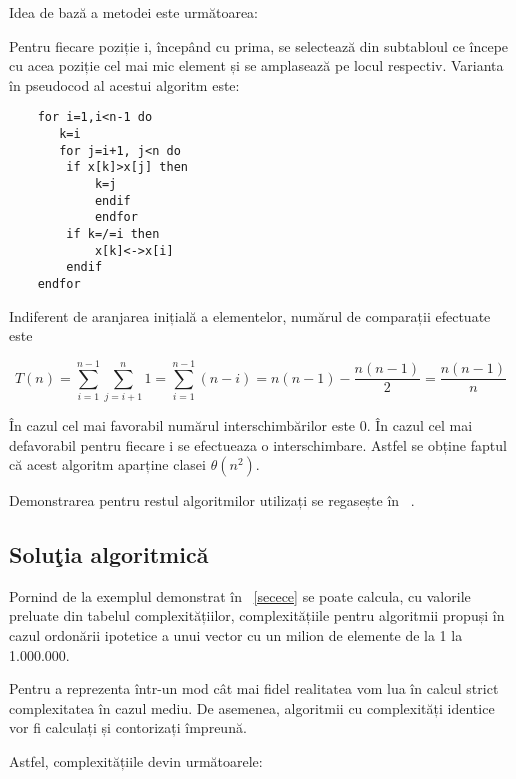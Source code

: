 \documentclass[12pt]{article}
\begin{document}
Idea de bază a metodei este următoarea:

Pentru fiecare poziție i, începând cu prima, se selectează din subtabloul ce începe cu acea poziție cel mai mic element și se amplasează pe locul respectiv.
Varianta în pseudocod al acestui algoritm este:
\pagebreak
\begin{lstlisting}
    for i=1,i<n-1 do
       k=i
       for j=i+1, j<n do
        if x[k]>x[j] then
            k=j
            endif
            endfor
        if k=/=i then
            x[k]<->x[i]
        endif
    endfor
\end{lstlisting}
 Indiferent de aranjarea inițială a elementelor, numărul de comparații efectuate este

\[ T(n)=\sum_{i=1}^{n-1} \sum_{j=i+1}^{n} 1= \sum_{i=1}^{n-1}(n-i)=n(n-1)-\frac{n(n-1)}{2}=\frac{n(n-1)}{n} \]

În cazul cel mai favorabil numărul interschimbărilor este 0. În cazul cel mai defavorabil pentru fiecare i se efectueaza o interschimbare. Astfel se obține faptul că acest algoritm aparține clasei $\theta(n^2)$.

Demonstrarea pentru restul algoritmilor utilizați se regasește în ~\cite{ZAHARIE2008}.

\subsection{Soluţia algoritmică}

Pornind de la exemplul demonstrat în ~\ref{secece} se poate calcula, cu valorile preluate din tabelul complexitățiilor, complexitățiile pentru algoritmii propuși în cazul ordonării ipotetice a unui vector cu un milion de elemente de la 1 la 1.000.000.

Pentru a reprezenta într-un mod cât mai fidel realitatea vom lua în calcul strict complexitatea în cazul mediu. De asemenea, algoritmii cu complexități identice vor fi calculați și contorizați împreună.

Astfel, complexitățiile devin următoarele:
\end{document}
